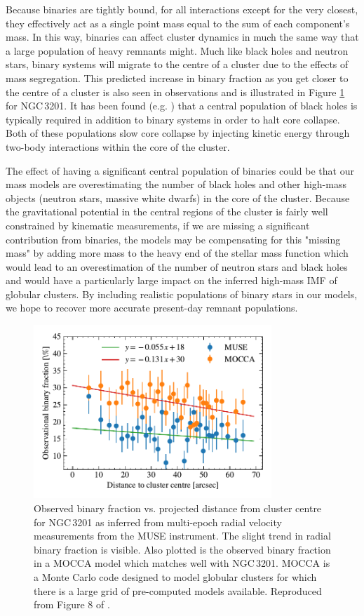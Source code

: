 Because binaries are tightly bound, for all interactions except for the very closest, they
effectively act as a single point mass equal to the sum of each component's mass. In this way,
binaries can affect cluster dynamics in much the same way that a large population of heavy remnants
might. Much like black holes and neutron stars, binary systems will migrate to the centre of a
cluster due to the effects of mass segregation.  This predicted increase in binary fraction as you
get closer to the centre of a cluster is also seen in observations and is illustrated in Figure
\ref{fig:1/radial_binary_fraction} for NGC\,3201. It has been found (e.g. \citealt{Kremer2019}) that
a central population of black holes is typically required in addition to binary systems in order to
halt core collapse. Both of these populations slow core collapse by injecting kinetic energy through
two-body interactions within the core of the cluster.

The effect of having a significant central population of binaries could be that our mass models are
overestimating the number of black holes and other high-mass objects (neutron stars, massive white
dwarfs) in the core of the cluster. Because the gravitational potential in the central regions of
the cluster is fairly well constrained by kinematic measurements, if we are missing a significant
contribution from binaries, the models may be compensating for this "missing mass" by adding more
mass to the heavy end of the stellar mass function which would lead to an overestimation of the
number of neutron stars and black holes and would have a particularly large impact on the inferred
high-mass IMF of globular clusters. By including realistic populations of binary stars in our
models, we hope to recover more accurate present-day remnant populations.

\begin{figure}
	\centering
	\includegraphics[width=0.8\textwidth]{figures/radial_binarity.pdf}
	\caption{Observed binary fraction vs. projected distance from cluster centre for NGC\,3201 as
		inferred from multi-epoch radial velocity measurements from the MUSE instrument.
		The slight trend in radial binary fraction is visible. Also plotted is the observed
		binary fraction in a MOCCA model which matches well with NGC\,3201. MOCCA is a Monte
		Carlo code designed to model globular clusters for which there is a large grid of
		pre-computed models available. Reproduced from Figure 8 of \citet{Giesers2019}.}
	\label{fig:1/radial_binary_fraction}
\end{figure}

